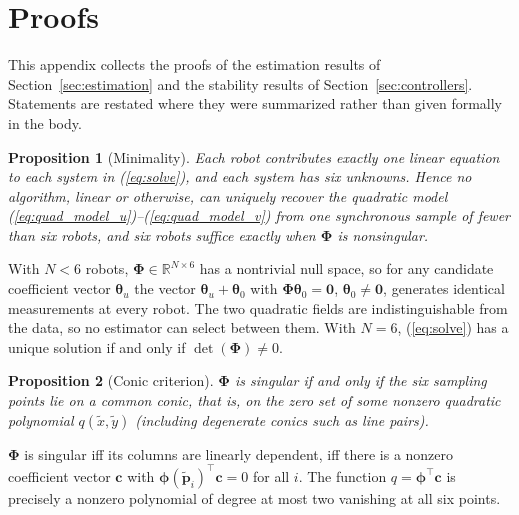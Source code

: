 \documentclass[lettersize,journal]{IEEEtran}
\newtheorem{proposition}{Proposition}
\begin{document}
\section{Proofs}
\label{app:proofs}

This appendix collects the proofs of the estimation results of
Section~\ref{sec:estimation} and the stability results of
Section~\ref{sec:controllers}. Statements are restated where they were
summarized rather than given formally in the body.

\begin{proposition}[Minimality]
\label{prop:minimality}
Each robot contributes exactly one linear equation to each system in
(\ref{eq:solve}), and each system has six unknowns. Hence no algorithm,
linear or otherwise, can uniquely recover the quadratic model
(\ref{eq:quad_model_u})--(\ref{eq:quad_model_v}) from one synchronous
sample of fewer than six robots, and six robots suffice exactly when
$\boldsymbol{\Phi}$ is nonsingular.
\end{proposition}

\begin{IEEEproof}
With $N < 6$ robots, $\boldsymbol{\Phi} \in \mathbb{R}^{N \times 6}$ has
a nontrivial null space, so for any candidate coefficient vector
$\boldsymbol{\theta}_u$ the vector $\boldsymbol{\theta}_u +
\boldsymbol{\theta}_0$ with $\boldsymbol{\Phi}\boldsymbol{\theta}_0 =
\mathbf{0}$, $\boldsymbol{\theta}_0 \neq \mathbf{0}$, generates identical
measurements at every robot. The two quadratic fields are
indistinguishable from the data, so no estimator can select between
them. With $N = 6$, (\ref{eq:solve}) has a unique solution if and only if
$\det(\boldsymbol{\Phi}) \neq 0$.
\end{IEEEproof}

\begin{proposition}[Conic criterion]
\label{prop:conic}
$\boldsymbol{\Phi}$ is singular if and only if the six sampling points
lie on a common conic, that is, on the zero set of some nonzero quadratic
polynomial $q(\tilde{x}, \tilde{y})$ (including degenerate conics such as
line pairs).
\end{proposition}

\begin{IEEEproof}
$\boldsymbol{\Phi}$ is singular iff its columns are linearly dependent,
iff there is a nonzero coefficient vector $\mathbf{c}$ with
$\boldsymbol{\phi}(\tilde{\mathbf{p}}_i)^\top \mathbf{c} = 0$ for all
$i$. The function $q = \boldsymbol{\phi}^\top \mathbf{c}$ is precisely a
nonzero polynomial of degree at most two vanishing at all six points.
\end{IEEEproof}
\end{document}
